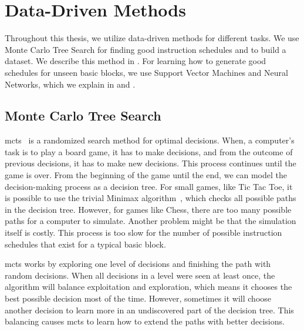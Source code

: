 \section{Data-Driven Methods}
\label{sec:bg:ml}
Throughout this thesis, we utilize data-driven methods for different tasks.
We use Monte Carlo Tree Search for finding good instruction schedules and to build a dataset.
We describe this method in .
For learning how to generate good schedules for unseen basic blocks, we use Support Vector Machines and Neural Networks, which we explain in  and .

\subsection{Monte Carlo Tree Search}
\label{sec:bg:mcts}
\ac{mcts}~\cite{abramson1990expected} is a randomized search method for optimal decisions.
When, \eg a computer's task is to play a board game, it has to make decisions, and from the outcome of previous decisions, it has to make new decisions.
This process continues until the game is over.
From the beginning of the game until the end, we can model the decision-making process as a decision tree.
For small games, like Tic Tac Toe, it is possible to use the trivial Minimax algorithm~\cite{neumann1928theorie}, which checks all possible paths in the decision tree.
However, for games like Chess, there are too many possible paths for a computer to simulate.
Another problem might be that the simulation itself is costly.
This process is too slow for the number of possible instruction schedules that exist for a typical basic block.

\ac{mcts} works by exploring one level of decisions  and finishing the path with random decisions.
When all decisions in a level were seen at least once, the algorithm will balance exploitation and exploration, which means it chooses the best possible decision most of the time.
However, sometimes it will choose another decision to learn more in an undiscovered part of the decision tree.
This balancing causes \ac{mcts} to learn how to extend the paths with better decisions.

